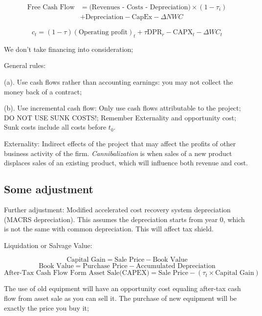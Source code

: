 \documentclass[10pt, a4paper]{article}
\begin{document}
    $$\begin{aligned}
                \text{Free Cash Flow} &=
            \text{(Revenues - Costs - Depreciation)} \times (1 - \tau_i) \\
            &+ \text{Depreciation} - \text{CapEx} - \Delta NWC
            \end{aligned}$$
    
    $$c_t = (1 - \tau)(\text{Operating profit})_t + \tau \text{DPR}_r - \text{CAPX}_t - \Delta WC_t$$

    We don't take financing into consideration;

    General rules: 

    \quad(a). Use cash flows rather than accounting earnings: you may not collect the money back of a contract; 
    
    \quad(b). Use incremental cash flow: Only use cash flows attributable to the project; DO NOT USE SUNK COSTS!; Remember Externality and opportunity cost; Sunk costs include all costs before $t_0$. 

    Externality: Indirect effects of the project that may affect the profits of other business activity of the firm. \emph{Cannibalization} is when sales of a new product displaces sales of an existing product, which will influence both revenue and cost.
    

    \subsection{Some adjustment}

    Further  adjustment: Modified accelerated cost recovery system depreciation (MACRS depreciation). This assumes the depreciation starts from year 0, which is not the same with common depreciation. This will affect tax shield.
    \medskip
    
    Liquidation or Salvage Value:

    $$\text{Capital Gain} = \text{Sale Price} - \text{Book Value}$$
    $$\text{Book Value} = \text{Purchase Price} - \text{Accumulated Depreciation}$$
    $$\text{After-Tax Cash Flow Form Asset Sale(CAPEX)} = \text{Sale Price} - (\tau_t \times \text{Capital Gain})$$

    The use of old equipment will have an opportunity cost equaling after-tax cash flow from asset sale as you can sell it. The purchase of new equipment will be exactly the price you buy it; 

    \medskip
\end{document}
